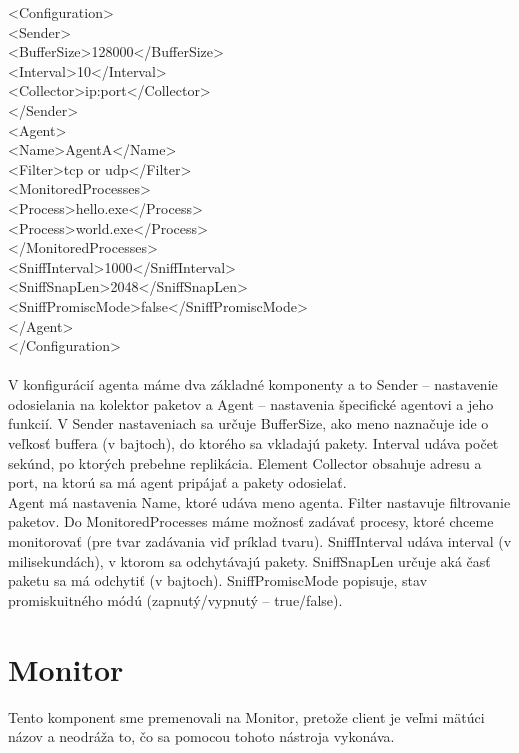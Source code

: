 \documentclass[a4paper,12pt]{article}
\begin{document}
<Configuration> \\
<Sender> \\
<BufferSize>128000</BufferSize> \\
<Interval>10</Interval> \\
<Collector>ip:port</Collector> \\
</Sender> \\
<Agent> \\
<Name>AgentA</Name> \\
<Filter>tcp or udp</Filter> \\
<MonitoredProcesses> \\
<Process>hello.exe</Process> \\
<Process>world.exe</Process> \\
</MonitoredProcesses> \\
<SniffInterval>1000</SniffInterval> \\
<SniffSnapLen>2048</SniffSnapLen> \\
<SniffPromiscMode>false</SniffPromiscMode> \\
</Agent> \\
</Configuration> \\ \\

V konfigurácií agenta máme dva základné komponenty a to Sender – nastavenie odosielania na kolektor paketov a Agent – nastavenia špecifické agentovi a jeho funkcií.
V Sender nastaveniach sa určuje BufferSize, ako meno naznačuje ide o veľkosť buffera (v bajtoch), do ktorého sa vkladajú pakety. Interval udáva počet sekúnd, po ktorých prebehne replikácia. Element Collector obsahuje adresu a port, na ktorú sa má agent pripájať a pakety odosielať. \\

Agent má nastavenia Name, ktoré udáva meno agenta. Filter nastavuje filtrovanie paketov. Do MonitoredProcesses máme možnosť zadávať procesy, ktoré chceme monitorovať (pre tvar zadávania viď príklad tvaru). SniffInterval udáva interval (v milisekundách), v ktorom sa odchytávajú pakety. SniffSnapLen určuje aká časť paketu sa má odchytiť (v bajtoch). SniffPromiscMode popisuje, stav promiskuitného módú (zapnutý/vypnutý – true/false).


\section{Monitor}

Tento komponent sme premenovali na Monitor, pretože client je veľmi mätúci názov a neodráža to, čo sa pomocou tohoto nástroja vykonáva.
\end{document}
